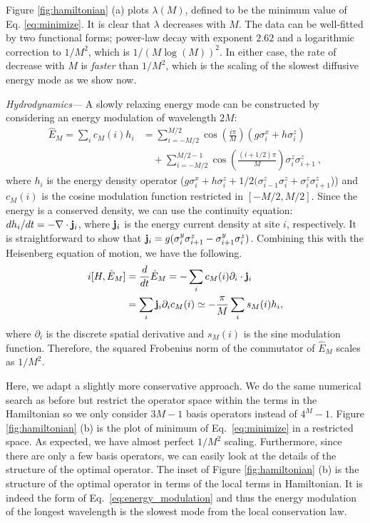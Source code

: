\documentclass[twocolumn,superscriptaddress, prb]{revtex4-1}
\begin{document}
Figure \ref{fig:hamiltonian} (a) plots $\lambda (M)$, defined to be the minimum value of Eq. \eqref{eq:minimize}.
It is clear that $\lambda$ decreases with $M$.
The data can be well-fitted by two functional forms; power-law decay with exponent $2.62$ and a logarithmic correction to $1/M^2$, which is $1/(M\log(M))^2$.
In either case, the rate of decrease with $M$ is {\it faster} than $1/M^2$, which is the scaling of the slowest diffusive energy mode as we show now.

{\it Hydrodynamics---}
A slowly relaxing energy mode can be constructed by considering an energy modulation of wavelength $2M$:
\begin{align}
\hat{E}_M = \sum_i c_M(i) h_i
&= \sum_{i=-M/2}^{M/2} \cos\left(\frac{i\pi}{M}\right)(g \sigma^x_i + h\sigma^z_i)\nonumber\\
&\quad+ \sum_{i=-M/2}^{M/2-1} \cos\left(\frac{(i+1/2)\pi}{M}\right)\sigma^z_i\sigma^z_{i+1} ~,
\label{eq:energy_modulation}
\end{align}
where $h_i$ is the energy density operator ($g \sigma^x_i + h\sigma^z_i + 1/2(\sigma^z_{i-1}\sigma^z_i + \sigma^z_i\sigma^z_{i+1}$))
and $c_M(i)$ is the cosine modulation function restricted in $[-M/2,M/2]$.
Since the energy is a conserved density, we can use the continuity equation:
$d h_i/dt = -\nabla \cdot {\bf j}_i$, where ${\bf j}_i$ is the energy current density at site $i$, respectively.
It is straightforward to show that ${\bf j}_i = g(\sigma^y_i \sigma^z_{i+1} - \sigma^y_{i+1} \sigma^z_i)$.
Combining this with the Heisenberg equation of motion, we have the following.
\begin{align}
 i[H,\hat{E}_M] &= \frac{d}{dt} \hat{E}_M = -\sum_i c_M(i) \partial_i \cdot {\bf j}_i \\
 &= \sum_i {\bf j}_i \partial_i c_M(i) \simeq -\frac{\pi}{M} \sum_i s_M(i) h_i,
\end{align}
where $\partial_i$ is the discrete spatial derivative and $s_M(i)$ is the sine modulation function.
Therefore, the squared Frobenius norm of the commutator of $\hat{E}_M$ scales as $1/M^2$.

Here, we adapt a slightly more conservative approach.
We do the same numerical search as before but restrict the operator space within the terms in the Hamiltonian
so we only consider $3M-1$ basis operators instead of $4^M-1$.
Figure \ref{fig:hamiltonian} (b) is the plot of minimum of Eq.~\eqref{eq:minimize} in a restricted space.
As expected, we have almost perfect $1/M^2$ scaling.
Furthermore, since there are only a few basis operators, we can easily look at the details of the structure of the optimal operator.
The inset of Figure \ref{fig:hamiltonian} (b) is the structure of the optimal operator in terms of the local terms in Hamiltonian.
It is indeed the form of Eq.~\eqref{eq:energy_modulation} and thus the energy modulation of the longest wavelength is the slowest mode
from the local conservation law.
\end{document}
